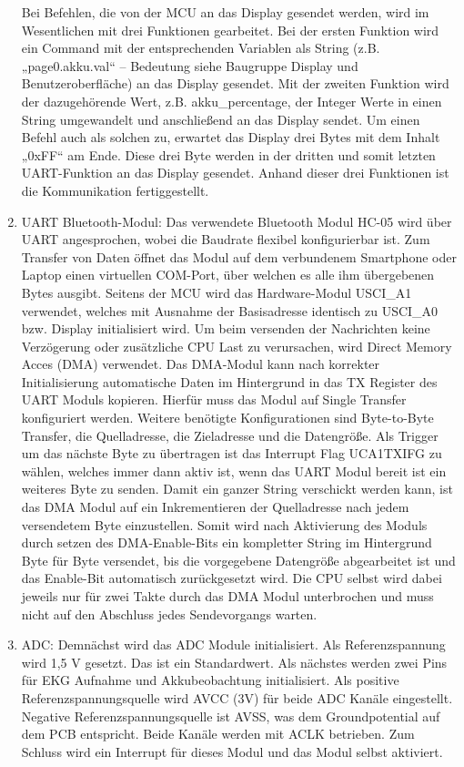 \begin{enumerate}
    Bei Befehlen, die von der MCU an das Display gesendet werden, wird im Wesentlichen mit drei Funktionen gearbeitet. Bei der ersten Funktion wird ein Command mit der entsprechenden Variablen als String (z.B. „page0.akku.val“ – Bedeutung siehe Baugruppe Display und Benutzeroberfläche) an das Display gesendet. Mit der zweiten Funktion wird der dazugehörende Wert, z.B. akku\_percentage, der Integer Werte in einen String umgewandelt und anschließend an das Display sendet. Um einen Befehl auch als solchen zu, erwartet das Display drei Bytes mit dem Inhalt „0xFF“ am Ende. Diese drei Byte werden in der dritten und somit letzten UART-Funktion an das Display gesendet. Anhand dieser drei Funktionen ist die Kommunikation fertiggestellt.
    \item UART Bluetooth-Modul: Das verwendete Bluetooth Modul HC-05 wird über UART angesprochen, wobei die Baudrate flexibel konfigurierbar ist. Zum Transfer von Daten öffnet das Modul auf dem verbundenem Smartphone oder Laptop einen virtuellen COM-Port, über welchen es alle ihm übergebenen Bytes ausgibt. Seitens der MCU wird das Hardware-Modul USCI\_A1 verwendet, welches mit Ausnahme der Basisadresse identisch zu USCI\_A0 bzw. Display initialisiert wird.
    Um beim versenden der Nachrichten keine Verzögerung oder zusätzliche CPU Last zu verursachen, wird Direct Memory Acces (DMA) verwendet. Das DMA-Modul kann nach korrekter Initialisierung automatische Daten im Hintergrund in das TX Register des UART Moduls kopieren. Hierfür muss das Modul auf Single Transfer konfiguriert werden. Weitere benötigte Konfigurationen sind Byte-to-Byte Transfer, die Quelladresse, die Zieladresse und die Datengröße. Als Trigger um das nächste Byte zu übertragen ist das Interrupt Flag UCA1TXIFG zu wählen, welches immer dann aktiv ist, wenn das UART Modul bereit ist ein weiteres Byte zu senden. Damit ein ganzer String verschickt werden kann, ist das DMA Modul auf ein Inkrementieren der Quelladresse nach jedem versendetem Byte einzustellen. Somit wird nach Aktivierung des Moduls durch setzen des DMA-Enable-Bits ein kompletter String im Hintergrund Byte für Byte versendet, bis die vorgegebene Datengröße abgearbeitet ist und das Enable-Bit automatisch zurückgesetzt wird. Die CPU selbst wird dabei jeweils nur für zwei Takte durch das DMA Modul unterbrochen und muss nicht auf den Abschluss jedes Sendevorgangs warten.
    \item ADC: Demnächst wird das ADC Module initialisiert. Als Referenzspannung wird 1,5 V gesetzt. Das ist ein Standardwert. Als nächstes werden zwei Pins für EKG Aufnahme und Akkubeobachtung initialisiert. Als positive Referenzspannungsquelle wird AVCC (3V) für beide ADC Kanäle eingestellt. Negative Referenzspannungsquelle ist AVSS, was dem Groundpotential auf dem PCB entspricht. Beide Kanäle werden mit ACLK betrieben. Zum Schluss wird ein Interrupt für dieses Modul und das Modul selbst aktiviert.

\end{enumerate}
